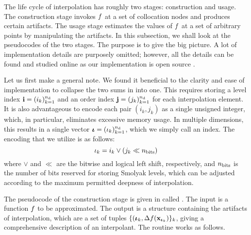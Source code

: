 The life cycle of interpolation has roughly two stages: construction and usage.
The construction stage invokes $f$ at a set of collocation nodes and produces
certain artifacts. The usage stage estimates the values of $f$ at a set of
arbitrary points by manipulating the artifacts. In this subsection, we shall
look at the pseudocodes of the two stages. The purpose is to give the big
picture. A lot of implementation details are purposely omitted; however, all the
details can be found and studied online as our implementation is open source
\cite{sources}.

Let us first make a general note. We found it beneficial to the clarity and ease
of implementation to collapse the two sums in  into one.
This requires storing a level index $\mathbf{i} = (i_k)_{k = 1}^{n_\text{d}}$ and an order
index $\mathbf{j} = (j_k)_{k = 1}^{n_\text{d}}$ for each interpolation element. It is also
advantageous to encode each pair $(i_k, j_k)$ as a single unsigned integer,
which, in particular, eliminates excessive memory usage. In multiple dimensions,
this results in a single vector ${\bm{\iota}} = (\iota_k)_{k = 1}^{n_\text{d}}$, which we simply
call an index. The encoding that we utilize is as follows:
\[
  \iota_k = i_k \lor (j_k \ll n_\text{bits})
\]
where $\lor$ and $\ll$ are the bitwise  and logical left shift,
respectively, and $n_\text{bits}$ is the number of bits reserved for storing
Smolyak levels, which can be adjusted according to the maximum permitted
deepness of interpolation.

The pseudocode of the construction stage is given in  called
. The  input is a function $f$ to be
approximated. The  output is a structure containing the
artifacts of interpolation, which are a set of tuples $\{ ({\bm{\iota}}_k,
\Delta f(\mathbf{x}_{{\bm{\iota}}_k}) \}_k$, giving a comprehensive description of an
interpolant. The routine works as follows.

